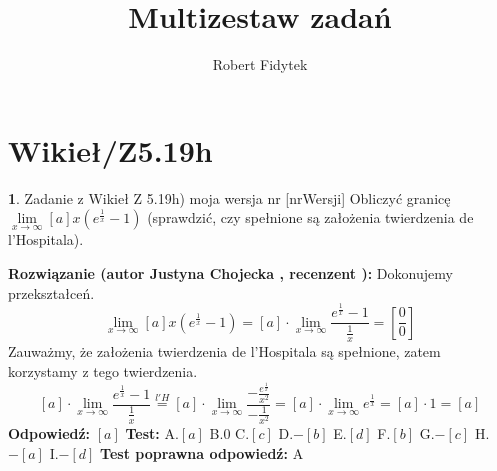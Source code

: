 \documentclass[12pt, a4paper]{article}
\title{Multizestaw zadań}
\author{Robert Fidytek}
\date{}
\theoremstyle{definition} %
\newtheorem{zad}{}
\newcommand{\kategoria}[1]{\section{#1}} %
\newcommand{\zadStart}[1]{\begin{zad}#1\newline} %
\newcommand{\zadStop}{\end{zad}}   %
\newcommand{\rozwStart}[2]{\noindent \textbf{Rozwiązanie (autor #1 , recenzent #2): }\newline} %
\newcommand{\rozwStop}{\newline}                                            %
\newcommand{\odpStart}{\noindent \textbf{Odpowiedź:}\newline}    %
\newcommand{\odpStop}{\newline}                                             %
\newcommand{\testStart}{\noindent \textbf{Test:}\newline} %
\newcommand{\testStop}{\newline} %
\newcommand{\kluczStart}{\noindent \textbf{Test poprawna odpowiedź:}\newline} %
\newcommand{\kluczStop}{\newline} %
\begin{document}
\maketitle


\kategoria{Wikieł/Z5.19h}
\zadStart{Zadanie z Wikieł Z 5.19h) moja wersja nr [nrWersji]}
Obliczyć granicę $\lim\limits_{x\to\infty}[a]x\left(e^{\frac{1}{x}}-1\right)$ (sprawdzić, czy spełnione są założenia twierdzenia de l'Hospitala).
\zadStop
\rozwStart{Justyna Chojecka}{}
Dokonujemy przekształceń.
$$\lim\limits_{x\to\infty}[a]x\left(e^{\frac{1}{x}}-1\right)=[a]\cdot\lim\limits_{x\to\infty}\frac{e^{\frac{1}{x}}-1}{\frac{1}{x}}=\left[\frac{0}{0}\right]$$
Zauważmy, że założenia twierdzenia de l'Hospitala są spełnione, zatem korzystamy z tego twierdzenia.
$$[a]\cdot\lim\limits_{x\to\infty}\frac{e^{\frac{1}{x}}-1}{\frac{1}{x}}\overset{l'H}{=}[a]\cdot\lim\limits_{x\to\infty}\frac{-\frac{e^{\frac{1}{x}}}{x^{2}}}{-\frac{1}{x^{2}}}=[a]\cdot\lim\limits_{x\to\infty}e^{\frac{1}{x}}=[a]\cdot 1=[a]$$
\rozwStop
\odpStart
$[a]$
\odpStop
\testStart
A.$[a]$
B.$0$
C.$[c]$
D.$-[b]$
E.$[d]$
F.$[b]$
G.$-[c]$
H.$-[a]$
I.$-[d]$
\testStop
\kluczStart
A
\kluczStop
\end{document}
